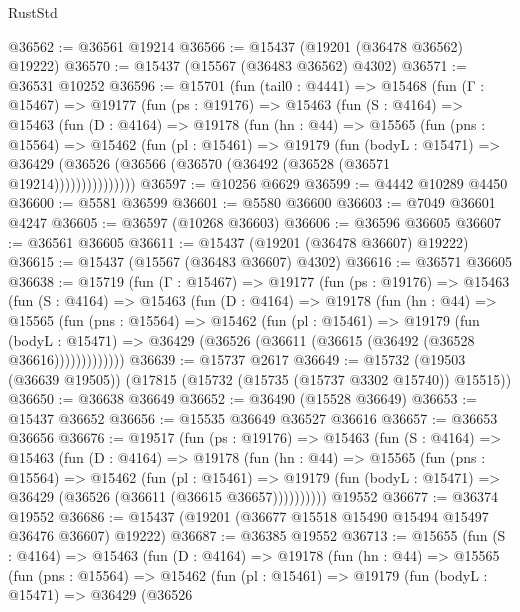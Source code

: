 \begin{lexlean}{RustStd}
\begin{coremodule}
@36562 := @36561 @19214
@36566 := @15437 (@19201 (@36478 @36562) @19222)
@36570 := @15437 (@15567 (@36483 @36562) @4302)
@36571 := @36531 @10252
@36596 := @15701
    (fun (tail0 : @4441) =>
    @15468
      (fun (Γ : @15467) =>
      @19177
        (fun (ps : @19176) =>
        @15463
          (fun (S : @4164) =>
          @15463
            (fun (D : @4164) =>
            @19178
              (fun (hn : @44) =>
              @15565
                (fun (pns : @15564) =>
                @15462
                  (fun (pl : @15461) =>
                  @19179
                    (fun (bodyL : @15471) =>
                    @36429 (@36526 (@36566 (@36570 (@36492 (@36528 (@36571 @19214)))))))))))))))
@36597 := @10256 @6629
@36599 := @4442 @10289 @4450
@36600 := @5581 @36599
@36601 := @5580 @36600
@36603 := @7049 @36601 @4247
@36605 := @36597 (@10268 @36603)
@36606 := @36596 @36605
@36607 := @36561 @36605
@36611 := @15437 (@19201 (@36478 @36607) @19222)
@36615 := @15437 (@15567 (@36483 @36607) @4302)
@36616 := @36571 @36605
@36638 := @15719
    (fun (Γ : @15467) =>
    @19177
      (fun (ps : @19176) =>
      @15463
        (fun (S : @4164) =>
        @15463
          (fun (D : @4164) =>
          @19178
            (fun (hn : @44) =>
            @15565
              (fun (pns : @15564) =>
              @15462
                (fun (pl : @15461) =>
                @19179
                  (fun (bodyL : @15471) =>
                  @36429 (@36526 (@36611 (@36615 (@36492 (@36528 @36616)))))))))))))
@36639 := @15737 @2617
@36649 := @15732 (@19503 (@36639 @19505)) (@17815 (@15732 (@15735 (@15737 @3302 @15740)) @15515))
@36650 := @36638 @36649
@36652 := @36490 (@15528 @36649)
@36653 := @15437 @36652
@36656 := @15535 @36649 @36527 @36616
@36657 := @36653 @36656
@36676 := @19517
    (fun (ps : @19176) =>
    @15463
      (fun (S : @4164) =>
      @15463
        (fun (D : @4164) =>
        @19178
          (fun (hn : @44) =>
          @15565
            (fun (pns : @15564) =>
            @15462
              (fun (pl : @15461) =>
              @19179 (fun (bodyL : @15471) => @36429 (@36526 (@36611 (@36615 @36657))))))))))
    @19552
@36677 := @36374 @19552
@36686 := @15437 (@19201 (@36677 @15518 @15490 @15494 @15497 @36476 @36607) @19222)
@36687 := @36385 @19552
@36713 := @15655
    (fun (S : @4164) =>
    @15463
      (fun (D : @4164) =>
      @19178
        (fun (hn : @44) =>
        @15565
          (fun (pns : @15564) =>
          @15462
            (fun (pl : @15461) =>
            @19179
              (fun (bodyL : @15471) =>
              @36429
                (@36526

\end{coremodule}
\end{lexlean}
